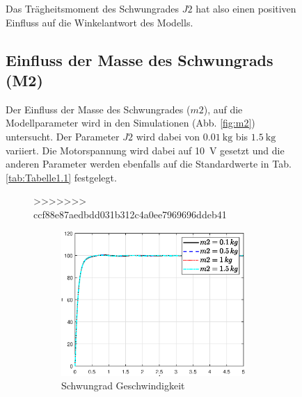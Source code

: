 \begin{figure}
 Das Trägheitsmoment des Schwungrades $J2$ hat also einen positiven Einfluss auf die Winkelantwort des Modells.\\  
 
 \subsection*{Einfluss der Masse des Schwungrads (M2)}
 Der Einfluss der Masse des Schwungrades ($m2$), auf die Modellparameter wird in den Simulationen (Abb. \ref{fig:m2}) untersucht. 
 Der Parameter $J2$ wird dabei von $\SI{0.01}{\kg}$ bis $\SI{1.5}{\kg}$ variiert.
 Die Motorspannung wird dabei auf \SI{10}{\volt} gesetzt und die anderen Parameter werden ebenfalls auf die Standardwerte in Tab. \ref{tab:Tabelle1.1} festgelegt.\\
 \begin{figure}
>>>>>>> ccf88e87aedbdd031b312c4a0ee7969696ddeb41
    \captionsetup[subfigure]{justification=centering,font=footnotesize}
    \begin{subfigure}[b]{0.49\linewidth}
        \includegraphics[width=\linewidth]{Bilder/5_sensi/fig/m2/phi_punkt.eps}
        \caption{Schwungrad Geschwindigkeit}
        \label{fig:m2_phi_punkt}
    \end{subfigure}
    \begin{subfigure}[b]{0.49 \linewidth}

\end{subfigure}
\end{figure}
\end{figure}
